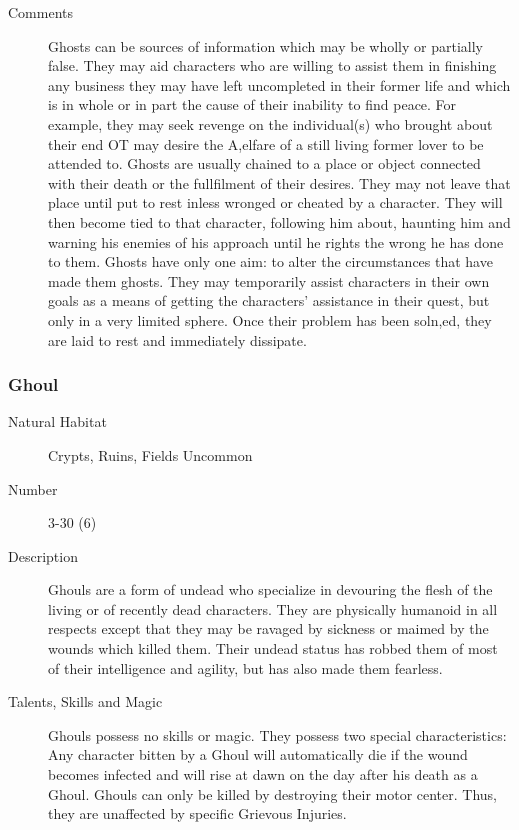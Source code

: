 \begin{multicols}{2}
\begin{description}
\item[Comments] Ghosts can be sources of information which may be wholly or
partially false. They may aid characters who are willing to assist
them in finishing any business they may have left uncompleted in their
former life and which is in whole or in part the cause of their
inability to find peace. For example, they may seek revenge on the
individual(s) who brought about their end OT may desire the A,elfare
of a still living former lover to be attended to. Ghosts are usually
chained to a place or object connected with their death or the
fullfilment of their desires.  They may not leave that place until put
to rest inless wronged or cheated by a character. They will then
become tied to that character, following him about, haunting him and
warning his enemies of his approach until he rights the wrong he has
done to them. Ghosts have only one aim: to alter the circumstances
that have made them ghosts. They may temporarily assist characters in
their own goals as a means of getting the characters' assistance in
their quest, but only in a very limited sphere. Once their problem has
been soln,ed, they are laid to rest and immediately dissipate.

\end{description}

\subsubsection{Ghoul}

\begin{description}
\item[Natural Habitat] Crypts, Ruins, Fields Uncommon

\item[Number]   3-30 (6)

\item[Description] Ghouls are a form of undead who specialize in devouring
the flesh of the living or of recently dead characters.  They are
physically humanoid in all respects except that they may be ravaged by
sickness or maimed by the wounds which killed them. Their undead
status has robbed them of most of their intelligence and agility, but
has also made them fearless.

\item[Talents, Skills and Magic] Ghouls possess no skills or magic.  They possess two special
characteristics: Any character bitten by a Ghoul will automatically
die if the wound becomes infected and will rise at dawn on the day
after his death as a Ghoul.  Ghouls can only be killed by destroying
their motor center.  Thus, they are unaffected by specific Grievous
Injuries.


\end{description}
\end{multicols}

